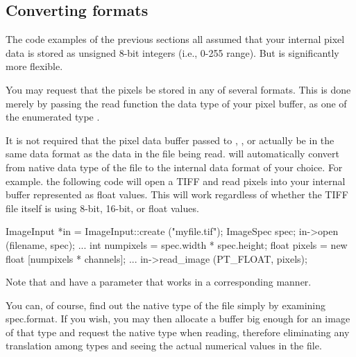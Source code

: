 \subsection{Converting formats}
\label{sec:imageinput:convertingformat}

The code examples of the previous sections all assumed that your
internal pixel data is stored as unsigned 8-bit integers (i.e., 0-255
range).  But \product is significantly more flexible.  

You may request that the pixels be stored in any of several formats.
This is done merely by passing the {\cf read} function the data type
of your pixel buffer, as one of the enumerated type \ParamBaseType.


It is not required that the pixel data buffer passed to \readimage,
\readscanline, or \readtile actually be in the same data format as the
data in the file being read.  \product will automatically convert from
native data type of the file to the internal data format of your choice.
For example. the following code will open a TIFF and read pixels into
your internal buffer represented as {\cf float} values.  This will work
regardless of whether the TIFF file itself is using 8-bit, 16-bit, or
float values.

\begin{code}
        ImageInput *in = ImageInput::create ("myfile.tif");
        ImageSpec spec;
        in->open (filename, spec);
        ...
        int numpixels = spec.width * spec.height;
        float pixels = new float [numpixels * channels];
        ...
        in->read_image (PT_FLOAT, pixels);
\end{code}

\noindent Note that \readscanline and \readtile have a parameter that
works in a corresponding manner.

You can, of course, find out the native type of the file simply by
examining {\cf spec.format}.  If you wish, you may then allocate a
buffer big enough for an image of that type and request the native type
when reading, therefore eliminating any translation among types and
seeing the actual numerical values in the file.

